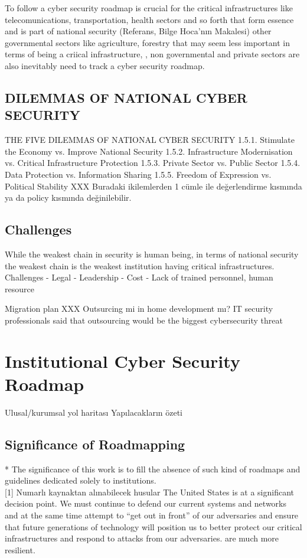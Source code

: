 \documentclass[journal]{IEEEtran}
\begin{document}
To follow a cyber security roadmap is crucial for the critical infrastructures like telecomunications, transportation, health sectors and so forth that form essence and  is part of national security (Referans, Bilge Hoca’nın Makalesi) other governmental sectors like agriculture, forestry that may seem less important in terms of being a criical infrastructure,  , non governmental and private sectors are also inevitably need to track a cyber security roadmap.
\\

\subsection{ DILEMMAS OF NATIONAL CYBER SECURITY}
THE FIVE DILEMMAS OF NATIONAL CYBER SECURITY
1.5.1. Stimulate the Economy vs. Improve National Security
1.5.2. Infrastructure Modernisation vs. Critical Infrastructure Protection
1.5.3. Private Sector vs. Public Sector
1.5.4. Data Protection vs. Information Sharing
1.5.5. Freedom of Expression vs. Political Stability\cite{kurt2012cyber} XXX Buradaki ikilemlerden 1  cümle ile değerlendirme kısmında ya da  policy kısmında değinilebilir.
\subsection{Challenges}
While the weakest chain in security is human being, in terms of national security the weakest chain is the weakest institution having critical infrastructures.
\\
Challenges
- Legal
- Leadership
- Cost
- Lack of trained personnel, human resource

Migration plan
XXX Outsurcing mi in home development mı?
IT security professionals said that outsourcing would be the biggest cybersecurity threat

\section{Institutional Cyber Security Roadmap}
Ulusal/kurumsal yol haritası Yapılacakların özeti
\subsection{Significance of Roadmapping}
* The significance of this work is to fill the absence of such kind of roadmaps and guidelines  dedicated solely to institutions.
\\

[1] Numarlı kaynaktan alınabilecek husular
The United States is at a significant decision point. We must continue to defend our current systems and networks and at the same time attempt to “get out in front” of our adversaries and ensure that future generations of technology will position us to better protect our critical infrastructures and respond to attacks from our adversaries.
are much more resilient.
\end{document}
